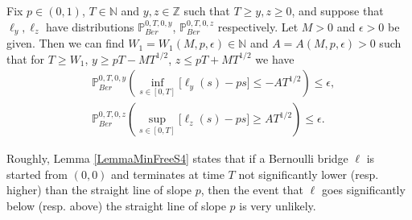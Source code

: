 \begin{lemma}\label{LemmaMinFreeS4} Fix $p \in (0,1)$, $T \in \mathbb{N}$ and $y,z\in \mathbb{Z}$ such that $T \geq y,z \geq 0$, and suppose that $\ell_y,\ell_z$ have distributions $\mathbb{P}^{0,T,0,y}_{Ber}$, $\mathbb{P}^{0,T,0,z}_{Ber}$ respectively. Let $M > 0$ and $\epsilon > 0$ be given. Then we can find $W_1=W_1(M,p, \epsilon) \in \mathbb{N}$ and $A=A(M,p, \epsilon) > 0$ such that for $T \geq W_1$, $ y \geq p T -  MT^{1/2}$, $z \leq pT + MT^{1/2}$ we have
\begin{equation}\label{minFree1S4}
\begin{split}
&\mathbb{P}^{0,T,0,y}_{Ber}\left( \inf_{s \in [ 0, T]}\big[ \ell_y(s) -  ps \big] \leq -AT^{1/2} \right) \leq \epsilon, \\ &\mathbb{P}^{0,T,0,z}_{Ber}\left( \sup_{s \in [ 0, T]}\big[ \ell_z(s) -  ps \big] \geq AT^{1/2} \right) \leq \epsilon.
\end{split}
\end{equation}
\end{lemma}
\begin{remark} Roughly, Lemma \ref{LemmaMinFreeS4} states that if a Bernoulli bridge $\ell$ is started from $(0,0)$ and terminates at time $T$ not significantly lower (resp. higher) than the straight line of slope $p$, then the event that $\ell$ goes significantly below (resp. above) the straight line of slope $p$ is very unlikely.
\end{remark}
